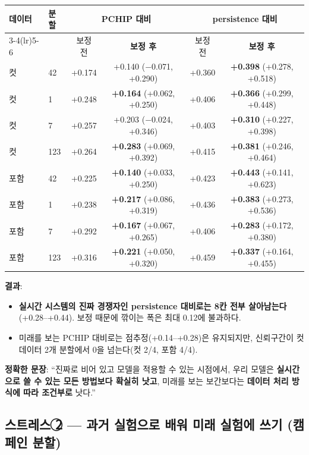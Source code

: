 \documentclass[10pt]{article}
\begin{document}
\begin{center}
\begin{tabular}{@{}llcccc@{}}
\toprule
\textbf{데이터} & \textbf{분할} & \multicolumn{2}{c}{\textbf{PCHIP 대비}} &
  \multicolumn{2}{c}{\textbf{persistence 대비}} \\
\cmidrule(lr){3-4}\cmidrule(lr){5-6}
 & & 보정 전 & \textbf{보정 후} & 보정 전 & \textbf{보정 후} \\
\midrule
컷 & 42 & +0.174 & +0.140 ($-$0.071, +0.290) & +0.360 & \textbf{+0.398} (+0.278, +0.518) \\
컷 & 1 & +0.248 & \textbf{+0.164} (+0.062, +0.250) & +0.406 & \textbf{+0.366} (+0.299, +0.448) \\
컷 & 7 & +0.257 & +0.203 ($-$0.024, +0.346) & +0.403 & \textbf{+0.310} (+0.227, +0.398) \\
컷 & 123 & +0.264 & \textbf{+0.283} (+0.069, +0.392) & +0.415 & \textbf{+0.381} (+0.246, +0.464) \\
\midrule
포함 & 42 & +0.225 & \textbf{+0.140} (+0.033, +0.250) & +0.423 & \textbf{+0.443} (+0.141, +0.623) \\
포함 & 1 & +0.238 & \textbf{+0.217} (+0.086, +0.319) & +0.436 & \textbf{+0.383} (+0.273, +0.536) \\
포함 & 7 & +0.292 & \textbf{+0.167} (+0.067, +0.265) & +0.406 & \textbf{+0.283} (+0.172, +0.380) \\
포함 & 123 & +0.316 & \textbf{+0.221} (+0.050, +0.320) & +0.459 & \textbf{+0.337} (+0.164, +0.455) \\
\bottomrule
\end{tabular}
\end{center}

\textbf{결과}:
\begin{itemize}
\item \textbf{실시간 시스템의 진짜 경쟁자인 persistence 대비로는 8칸 전부 살아남는다}
  (+0.28--+0.44). 보정 때문에 깎이는 폭은 최대 0.12에 불과하다.
\item 미래를 보는 PCHIP 대비로는 점추정(+0.14--+0.28)은 유지되지만, 신뢰구간이 컷 데이터
  2개 분할에서 0을 넘는다(컷 2/4, 포함 4/4).
\end{itemize}

\textbf{정확한 문장}: ``진짜로 비어 있고 모델을 적용할 수 있는 시점에서, 우리 모델은
\textbf{실시간으로 쓸 수 있는 모든 방법보다 확실히 낫고}, 미래를 보는 보간보다는
\textbf{데이터 처리 방식에 따라 조건부로} 낫다.''

\subsection{스트레스 \textcircled{2} --- 과거 실험으로 배워 미래 실험에 쓰기 (캠페인 분할)}
\end{document}
